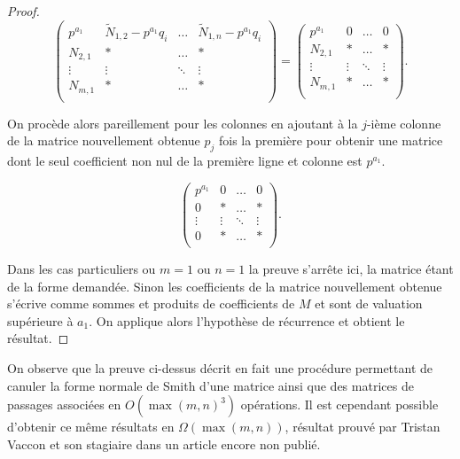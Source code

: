 \begin{proof}
	\[
 		\begin{pmatrix} p^{a_1}  & \tilde{N}_{1,2}- p^{a_1}  q_{i} & \ldots & \tilde{N}_{1,n}- p^{a_1}  q_{i} \\
			N_{2,1} & * & \ldots & *\\
			\vdots & \vdots & \ddots & \vdots \\
			N_{m,1} &* & \ldots & *\\
		\end{pmatrix} 
 = 		\begin{pmatrix} p^{a_1}& 0 & \ldots & 0 \\
			N_{2,1} & * & \ldots & *\\
			\vdots & \vdots & \ddots & \vdots \\
			N_{m,1} &* & \ldots & *\\
		\end{pmatrix} 
	.\] 

On procède alors pareillement pour les colonnes en ajoutant à la $j$-ième colonne de la matrice nouvellement obtenue $p_{j}$ fois la première pour obtenir une matrice dont le seul coefficient non nul de la première ligne et colonne est $p^{a_1}$.

	\[ 		\begin{pmatrix}  p^{a_1}& 0 & \ldots & 0 \\
			0 & * & \ldots & *\\
			\vdots & \vdots & \ddots & \vdots \\
			0 &* & \ldots & *\\
		\end{pmatrix} 
	.\] 

Dans les cas particuliers ou $m = 1$ ou $n=1$ la preuve s'arrête ici, la matrice étant de la forme demandée. 
Sinon les coefficients de la matrice nouvellement obtenue s'écrive comme sommes et produits de coefficients de $M$ et sont de valuation supérieure à $a_1$. On applique alors l'hypothèse de récurrence et obtient le résultat.
	\end{proof}

	\begin{remarques}
		On observe que la preuve ci-dessus décrit en fait une procédure permettant de canuler la forme normale de Smith d'une matrice ainsi que des matrices de passages associées en $O\left( \max\left( m,n \right) ^3 \right) $ opérations. Il est cependant possible d'obtenir ce même résultats en $\Omega( \max(m,n)) $, résultat prouvé par Tristan Vaccon et son stagiaire dans un article encore non publié.
	\end{remarques}



